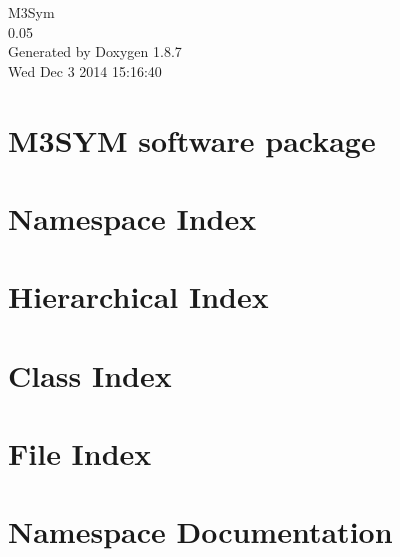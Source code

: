 \documentclass[twoside]{book}
\newcommand{\+}{\discretionary{\mbox{\scriptsize$\hookleftarrow$}}{}{}}
\newcommand{\clearemptydoublepage}{%
  \newpage{\pagestyle{empty}\cleardoublepage}%
}
\begin{document}
\hypersetup{pageanchor=false,
             bookmarks=true,
             bookmarksnumbered=true,
             pdfencoding=unicode
            }
\begin{titlepage}
\vspace*{7cm}
\begin{center}%
{\Large M3\+Sym \\[1ex]\large 0.\+05 }\\
\vspace*{1cm}
{\large Generated by Doxygen 1.8.7}\\
\vspace*{0.5cm}
{\small Wed Dec 3 2014 15:16:40}\\
\end{center}
\end{titlepage}
\clearemptydoublepage
\tableofcontents
\clearemptydoublepage
{}
\hypersetup{pageanchor=true}

\chapter{M3\+S\+Y\+M software package}
\label{index}\hypertarget{index}{}
\chapter{Namespace Index}

\chapter{Hierarchical Index}

\chapter{Class Index}

\chapter{File Index}

\chapter{Namespace Documentation}



\end{document}

